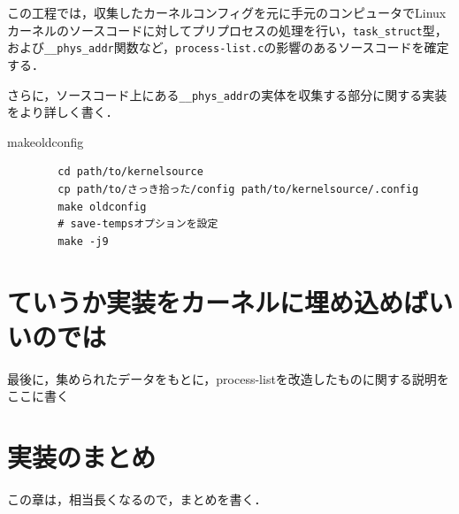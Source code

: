この工程では，収集したカーネルコンフィグを元に手元のコンピュータでLinuxカーネルのソースコードに対してプリプロセスの処理を行い，\verb|task_struct|型，
および\verb|__phys_addr|関数など，\verb|process-list.c|の影響のあるソースコードを確定する．

さらに，ソースコード上にある\verb|__phys_addr|の実体を収集する部分に関する実装をより詳しく書く．

\begin{itembox}[l]{makeoldconfig}
    \begin{verbatim}
        cd path/to/kernelsource
        cp path/to/さっき拾った/config path/to/kernelsource/.config
        make oldconfig
        # save-tempsオプションを設定
        make -j9
    \end{verbatim}
\end{itembox}

\section{ていうか実装をカーネルに埋め込めばいいのでは}

最後に，集められたデータをもとに，process-listを改造したものに関する説明をここに書く

\section{実装のまとめ}

この章は，相当長くなるので，まとめを書く．
